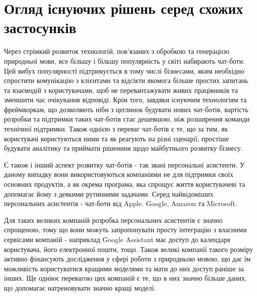 \section{Огляд існуючих рішень серед схожих застосунків}
Через стрімкий розвиток технологій, пов'язаних з обробкою та генерацією природньої мови, все більшу і більшу популярність у світі набирають чат-боти. Цей вибух популярності підтримується в тому числі бізнесами, яким необхідно спростити комунікацію з клієнтами та відсікти якомога більше простих запитань та взаємодій з користувачами, щоб не перевантажувати живих працівників та зменшити час очікування відповіді. Крім того, завдяки існуючим технологіям та фреймворкам, що дозволяють ніби з цеглинок будувати нових чат-ботів, вартість розробки та підтримки таких чат-ботів стає дешевшою, ніж розширення команди технічної підтримки. Також однією з переваг чат-ботів є те, що за тим, як користувачі користуються ними та як реагують на різні сценарії, простіше будувати аналітику та приймати рішенння щодо майбутнього розвитку бізнесу.


Є також і інший аспект розвитку чат-ботів - так звані персональні асистенти. У даному випадку вони використовуються компаніями не для підтримки своїх основних продуктів, а як окрема програма, яка спрощує життя користувачеві та допомагає йому з деякими рутинними задачами. Серед найвідоміших персональних асистентів - чат-боти від Apple. Google, Amazon та Microsoft. 


Для таких великих компаній розробка персональних асистентів є значно спрощеною, тому що вони можуть запропонувати просту інтеграцію з власними сервісами компаній - наприклад Google Assistant має доступ до календаря користувача, його електронної пошти, тощо. Також великі компанії такого розміру активно фінансують дослідження у сфері роботи з природньою мовою, що дає їм можливість користуватися кращими моделями та мати до них доступ раніше за інших. Ще одніює перевагою цих компаній є те, що в них значно більше даних, що допомагає натреновувати значно кращі моделі.
